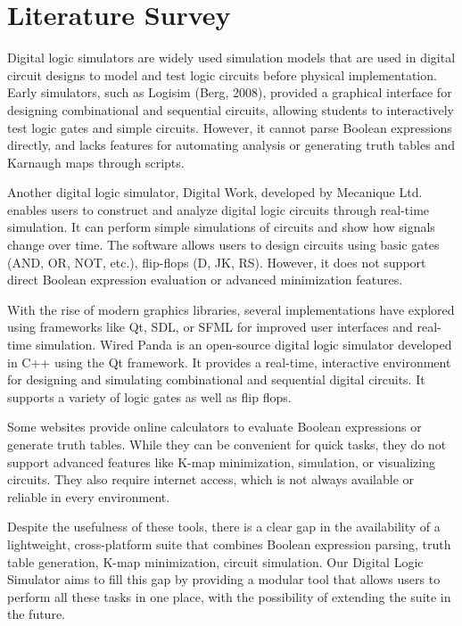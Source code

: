 \section{Literature Survey}
Digital logic simulators are widely used simulation models that are used in digital circuit designs to model and test logic circuits before physical implementation. Early simulators, such as Logisim (Berg, 2008), provided a graphical interface for designing combinational and sequential circuits, allowing students to interactively test logic gates and simple circuits. However, it cannot parse Boolean expressions directly, and lacks features for automating analysis or generating truth tables and Karnaugh maps through scripts.

\vspace{0.30cm}
Another digital logic simulator, Digital Work, developed by Mecanique Ltd. enables users to construct and analyze digital logic circuits through real-time simulation. It can perform simple simulations of circuits and show how signals change over time. The software allows users to design circuits using basic gates (AND, OR, NOT, etc.), flip-flops (D, JK, RS). However, it does not support direct Boolean expression evaluation or advanced minimization features.

\vspace{0.30cm}
With the rise of modern graphics libraries, several implementations have explored using frameworks like Qt, SDL, or SFML for improved user interfaces and real-time simulation. Wired Panda is an open-source digital logic simulator developed in C++ using the Qt framework. It provides a real-time, interactive environment for designing and simulating combinational and sequential digital circuits. It supports a variety of logic gates as well as flip flops.

\vspace{0.30cm}
Some websites provide online calculators to evaluate Boolean expressions or generate truth tables. While they can be convenient for quick tasks, they do not support advanced features like K-map minimization, simulation, or visualizing circuits. They also require internet access, which is not always available or reliable in every environment.

\vspace{0.30cm}
Despite the usefulness of these tools, there is a clear gap in the availability of a lightweight, cross-platform suite that combines Boolean expression parsing, truth table generation, K-map minimization, circuit simulation. Our Digital Logic Simulator aims to fill this gap by providing a modular tool that allows users to perform all these tasks in one place, with the possibility of extending the suite in the future.
\clearpage